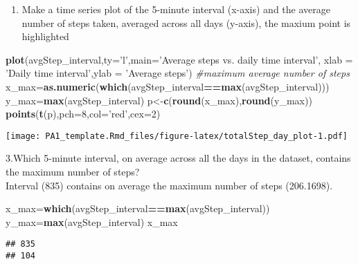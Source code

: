 \documentclass[
]{article}
\newenvironment{Shaded}{\begin{snugshade}}{\end{snugshade}}
\newcommand{\CommentTok}[1]{\textcolor[rgb]{0.56,0.35,0.01}{\textit{#1}}}
\newcommand{\DataTypeTok}[1]{\textcolor[rgb]{0.13,0.29,0.53}{#1}}
\newcommand{\DecValTok}[1]{\textcolor[rgb]{0.00,0.00,0.81}{#1}}
\newcommand{\KeywordTok}[1]{\textcolor[rgb]{0.13,0.29,0.53}{\textbf{#1}}}
\newcommand{\NormalTok}[1]{#1}
\newcommand{\OperatorTok}[1]{\textcolor[rgb]{0.81,0.36,0.00}{\textbf{#1}}}
\newcommand{\StringTok}[1]{\textcolor[rgb]{0.31,0.60,0.02}{#1}}
\providecommand{\tightlist}{%
  \setlength{\itemsep}{0pt}\setlength{\parskip}{0pt}}
\begin{document}
\begin{enumerate}
\def\labelenumi{\arabic{enumi}.}
\setcounter{enumi}{1}
\tightlist
\item
  Make a time series plot of the 5-minute interval (x-axis) and the
  average number of steps taken, averaged across all days (y-axis), the
  maxium point is highlighted
\end{enumerate}

\begin{Shaded}
\begin{Highlighting}[]
\KeywordTok{plot}\NormalTok{(avgStep_interval,}\DataTypeTok{ty=}\StringTok{'l'}\NormalTok{,}\DataTypeTok{main=}\StringTok{'Average steps vs. daily time interval'}\NormalTok{,}
     \DataTypeTok{xlab =} \StringTok{'Daily time interval'}\NormalTok{,}\DataTypeTok{ylab =} \StringTok{'Average steps'}\NormalTok{)}
\CommentTok{#maximum average number of steps}
\NormalTok{x_max=}\KeywordTok{as.numeric}\NormalTok{(}\KeywordTok{which}\NormalTok{(avgStep_interval}\OperatorTok{==}\KeywordTok{max}\NormalTok{(avgStep_interval)))}
\NormalTok{y_max=}\KeywordTok{max}\NormalTok{(avgStep_interval)}
\NormalTok{p<-}\KeywordTok{c}\NormalTok{(}\KeywordTok{round}\NormalTok{(x_max),}\KeywordTok{round}\NormalTok{(y_max))}
\KeywordTok{points}\NormalTok{(}\KeywordTok{t}\NormalTok{(p),}\DataTypeTok{pch=}\DecValTok{8}\NormalTok{,}\DataTypeTok{col=}\StringTok{'red'}\NormalTok{,}\DataTypeTok{cex=}\DecValTok{2}\NormalTok{)}
\end{Highlighting}
\end{Shaded}

\texttt{[image: PA1\_template.Rmd\_files/figure-latex/totalStep\_day\_plot-1.pdf]}

3.Which 5-minute interval, on average across all the days in the
dataset, contains the maximum number of steps?\\
Interval (835) contains on average the maximum number of steps
(206.1698).

\begin{Shaded}
\begin{Highlighting}[]
\NormalTok{x_max=}\KeywordTok{which}\NormalTok{(avgStep_interval}\OperatorTok{==}\KeywordTok{max}\NormalTok{(avgStep_interval))}
\NormalTok{y_max=}\KeywordTok{max}\NormalTok{(avgStep_interval)}
\NormalTok{x_max}
\end{Highlighting}
\end{Shaded}

\begin{verbatim}
## 835 
## 104
\end{verbatim}
\end{document}
